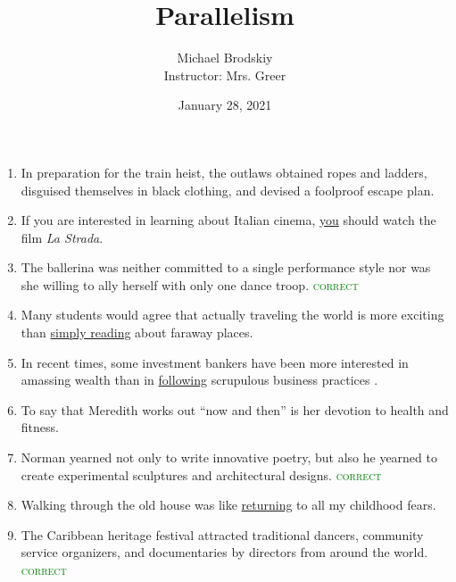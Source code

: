 \documentclass[12pt]{article}
\title{Parallelism}
\date{January 28, 2021}
\author{Michael Brodskiy\\ \small Instructor: Mrs. Greer}
\begin{document}
    \maketitle

    \begin{enumerate}

        \begin{center}
          Balance the sentence, if necessary
        \end{center}

      \item In preparation for the train heist, the outlaws obtained ropes and ladders, disguised themselves in black clothing, and  devised a foolproof escape plan.

      \item If you are interested in learning about Italian cinema,  \underline{you} should watch the film \textit{La Strada}.

      \item The ballerina was neither committed to a single performance style nor was she willing to ally herself with only one dance troop. \textcolor{green}{\textsc{correct}}

      \item Many students would agree that actually traveling the world is more exciting than  \underline{simply reading} about faraway places.

      \item In recent times, some investment bankers have been more interested in amassing wealth than in  \underline{following} scrupulous  business practices .

      \item To say that Meredith works out ``now and then'' is   her devotion to health and fitness.

      \item Norman yearned not only to write innovative poetry, but also he yearned to create experimental sculptures and architectural designs. \textcolor{green}{\textsc{correct}}

      \item Walking through the old house was like  \underline{returning} to all my childhood fears.

      \item The Caribbean heritage festival attracted traditional dancers, community service organizers, and documentaries by directors from around the world. \textcolor{green}{\textsc{correct}}


\end{enumerate}
\end{document}
